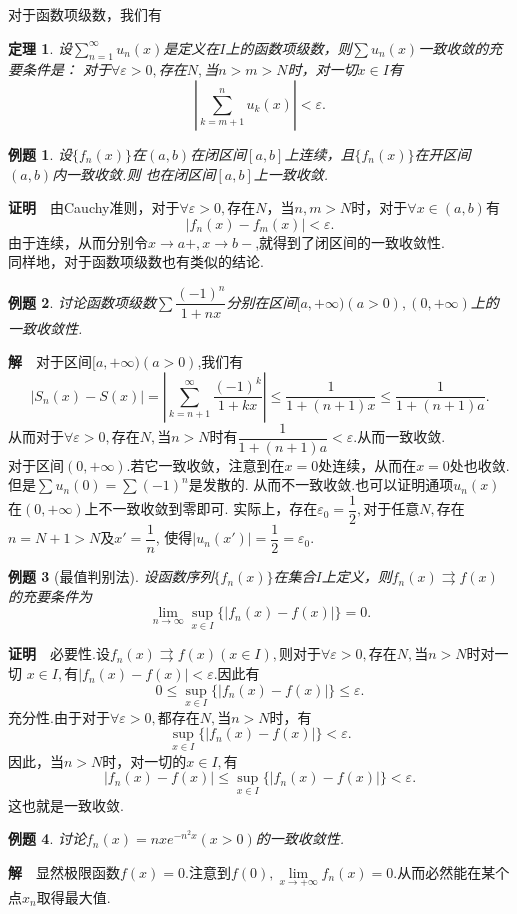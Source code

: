 \documentclass[UTF8]{article}
\newcommand{\zm}{\textbf{证明}$\quad$}
\newcommand{\jie}{\textbf{解}$\quad$}
\newtheorem{thm}{\hspace{2em}定理}[section]
\newtheorem{exa}{\hspace{2em}例题}[section]
\begin{document}
对于函数项级数，我们有
\begin{thm}
  设$\sum\limits_{n=1}^\infty u_n(x)$是定义在$I$上的函数项级数，则$\sum u_n(x)$一致收敛的充要条件是：
  对于$\forall\varepsilon>0,$存在$N,$当$n>m>N$时，对一切$x\in I$有
  $$\left|\sum_{k=m+1}^nu_k(x)\right|<\varepsilon.$$
\end{thm}
\begin{exa}
  设$\{f_n(x)\}$在$(a,b)$在闭区间$[a,b]$上连续，且$\{f_n(x)\}$在开区间$(a,b)$内一致收敛.则
  也在闭区间$[a,b]$上一致收敛.
\end{exa}
\zm 由Cauchy准则，对于$\forall\varepsilon>0,$存在$N$，当$n,m>N$时，对于$\forall x\in(a,b)$有
$$|f_n(x)-f_m(x)|<\varepsilon.$$
由于连续，从而分别令$x\to a+,x\to b-$,就得到了闭区间的一致收敛性.\\
同样地，对于函数项级数也有类似的结论.
\begin{exa}
  讨论函数项级数$\sum \dfrac{(-1)^n}{1+nx}$分别在区间$[a,+\infty)(a>0),(0,+\infty)$上的一致收敛性.
\end{exa}
\jie 对于区间$[a,+\infty)(a>0)$,我们有
$$|S_n(x)-S(x)|=\left|\sum_{k=n+1}^\infty\frac{(-1)^k}{1+kx}\right|\le\frac{1}{1+(n+1)x}\le\frac{1}{1+(n+1)a}.$$
从而对于$\forall\varepsilon>0,$存在$N,$当$n>N$时有$\dfrac{1}{1+(n+1)a}<\varepsilon.$从而一致收敛.\\
对于区间$(0,+\infty).$若它一致收敛，注意到在$x=0$处连续，从而在$x=0$处也收敛.但是$\sum u_n(0)=\sum(-1)^n$是发散的.
从而不一致收敛.也可以证明通项$u_n(x)$在$(0,+\infty)$上不一致收敛到零即可.
实际上，存在$\varepsilon_0=\dfrac{1}{2},$对于任意$N,$存在$n=N+1>N$及$x'=\dfrac{1}{n}$,
使得$|u_n(x')|=\dfrac{1}{2}=\varepsilon_0.$
\begin{exa}[最值判别法]
  设函数序列$\{f_n(x)\}$在集合$I$上定义，则$f_n(x)\rightrightarrows f(x)$的充要条件为
  $$\lim_{n\to\infty}\sup_{x\in I}\{|f_n(x)-f(x)|\}=0.$$
\end{exa}
\zm 必要性.设$f_n(x)\rightrightarrows f(x)(x\in I),$则对于$\forall\varepsilon>0,$存在$N,$当$n>N$时对一切
$x\in I,$有$|f_n(x)-f(x)|<\varepsilon.$因此有
$$0\le\sup_{x\in I}\{|f_n(x)-f(x)|\}\le\varepsilon.$$
充分性.由于对于$\forall\varepsilon>0,$都存在$N,$当$n>N$时，有
$$\sup_{x\in I}\{|f_n(x)-f(x)|\}<\varepsilon.$$
因此，当$n>N$时，对一切的$x\in I,$有
$$|f_n(x)-f(x)|\le\sup_{x\in I}\{|f_n(x)-f(x)|\}<\varepsilon.$$
这也就是一致收敛.
\begin{exa}
  讨论$f_n(x)=nxe^{-n^2x}(x>0)$的一致收敛性.
\end{exa}
\jie 显然极限函数$f(x)=0.$注意到$f(0),\lim\limits_{x\to+\infty}f_n(x)=0.$从而必然能在某个点$x_n$取得最大值.
\end{document}
